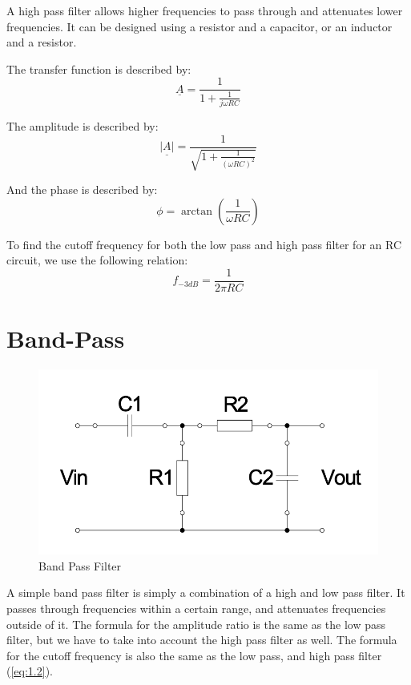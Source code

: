 A high pass filter allows higher frequencies to pass through and attenuates lower frequencies.
It can be designed using a resistor and a capacitor, or an inductor and a resistor.

The transfer function is described by:
\begin{equation}
    \underline{A} = \frac{1}{1+\frac{1}{j \omega RC}}
\end{equation}

The amplitude is described by:
\begin{equation}
    \underline{|A|} = \frac{1}{\sqrt{1+\frac{1}{\left({\omega RC}\right)^2}}}
\end{equation}

And the phase is described by:
\begin{equation}
    \phi = \arctan(\frac{1}{\omega RC})
\end{equation}

To find the cutoff frequency for both the low pass and high pass filter for an RC circuit, we use the following relation:
\begin{equation}
    f_{-3dB} = \frac{1}{2 \pi RC}
\end{equation}

\section{Band-Pass}
\begin{figure}[H]
    \centering
    \includegraphics[scale=0.75]{images/figure_band_pass.png}
    \caption{Band Pass Filter}
\end{figure}


A simple band pass filter is simply a combination of a high and low pass filter. It passes through frequencies within a certain range, and attenuates frequencies outside of it.
The formula for the amplitude ratio is the same as the low pass filter, but we have to take into account the high pass filter as well. The formula for the cutoff frequency is also the same as the low pass, and high pass filter (\ref{eq:1.2}).


